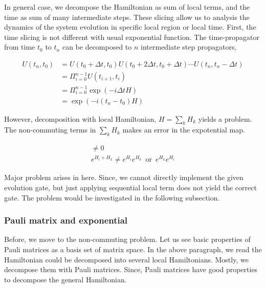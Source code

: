 In general case, we decompose the Hamiltonian as sum of local terms,
and the time as sum of many intermediate steps.
These slicing allow us to analysis the dynamics of the system evolution
in specific local region or local time. 
First, the time slicing is not different with usual exponential function.
The time-propagator from time $t_0$ to $t_n$ can be decomposed to 
$n$ intermediate step propagators,

\begin{eqnarray*}
    U(t_n, t_0) &= U(t_0 + \Delta t, t_0) U(t_0 + 2\Delta t, t_0 + \Delta t) \cdots U(t_n, t_n - \Delta t) \\
                &= \Pi_{i=0}^{n-1} U(t_{i+1}, t_i)\\
                &= \Pi_{i=0}^{n-1} \exp \left( - i \Delta t H\right)\\
                &= \exp \left( - i (t_n - t_0) H\right)\
\end{eqnarray*}

However, decomposition with local Hamiltonian, $H = \sum_k H_k$ yields 
a problem. The non-commuting terms in $\sum_k H_k$ makes an error in the expotential map.

\begin{align*}
    [H_i, H_k] \neq 0\\
    e^{H_i + H_k} \neq e^{H_i} e^{H_k} \, \text{ or } \, e^{H_k} e^{H_i}
\end{align*}

Major problem arises in here. 
Since, we cannot directly implement the given evolution gate, 
but just applying sequential local term does not yield
the correct gate. The problem would be investigated in the following 
subsection. 

\subsubsection{Pauli matrix and exponential}

Before, we move to the non-commuting problem. 
Let us see basic properties of Pauli matrices as a basis set of matrix space.
In the above paragraph, we read the Hamiltonian could be decomposed 
into several local Hamiltonians. 
Mostly, we decompose them with Pauli matrices.
Since, Pauli matrices have good properties to decompose 
the general Hamiltonian. 

